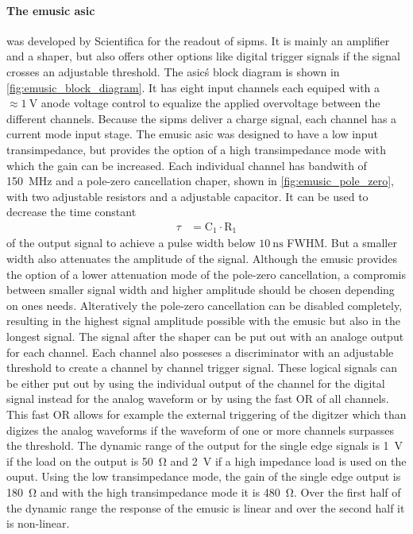 \paragraph{The \ac{emusic} \ac{asic}} was developed by Scientifica for the readout of \acp{sipm}.
It is mainly an amplifier and a shaper, but also offers other options like digital trigger signals if the signal crosses an adjustable threshold.
The \ac{asic}\'s block diagram is shown in \autoref{fig:emusic_block_diagram}.
It has eight input channels each equiped with a $\approx\SI{1}{\volt}$ anode voltage control to equalize the applied overvoltage between the different channels.
Because the \acp{sipm} deliver a charge signal, each channel has a current mode input stage.
The \ac{emusic} \ac{asic} was designed to have a low input transimpedance, but provides the option of a high transimpedance mode with which the gain can be increased.
Each individual channel has bandwith of \SI{150}{\mega\hertz} and a pole-zero cancellation chaper, shown in \autoref{fig:emusic_pole_zero}, with two adjustable resistors and a adjustable capacitor.
It can be used to decrease the time constant 
\begin{align}
	\tau &= \text{C}_1\cdot\text{R}_1
\end{align}
of the output signal to achieve a pulse width below $\SI{10}{\nano\second}$ FWHM.
But a smaller width also attenuates the amplitude of the signal.
Although the \ac{emusic} provides the option of a lower attenuation mode of the pole-zero cancellation, a compromis between smaller signal width and higher amplitude should be chosen depending on ones needs.
Alteratively the pole-zero cancellation can be disabled completely, resulting in the highest signal amplitude possible with the \ac{emusic} but also in the longest signal.
The signal after the shaper can be put out with an analoge output for each channel.
Each channel also posseses a discriminator with an adjustable threshold to create a channel by channel trigger signal.
These logical signals can be either put out by using the individual output of the channel for the digital signal instead for the analog waveform or by using the fast OR of all channels.
This fast OR allows for example the external triggering of the digitzer which than digizes the analog waveforms if the waveform of one or more channels surpasses the threshold.
The dynamic range of the output for the single edge signals is \SI{1}{\volt} if the load on the output is \SI{50}{\ohm} and \SI{2}{\volt} if a high impedance load is used on the ouput.
Using the low transimpedance mode, the gain of the single edge output is \SI{180}{\ohm} and with the high transimpedance mode it is \SI{480}{\ohm}.
Over the first half of the dynamic range the response of the \ac{emusic} is linear and over the second half it is non-linear.

